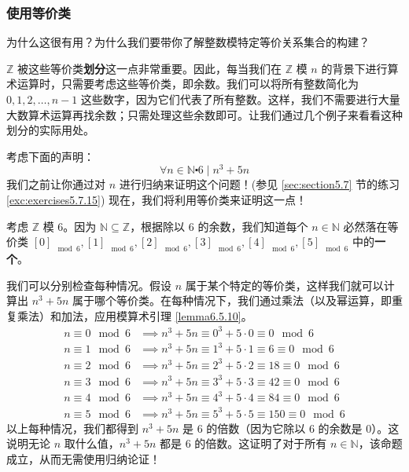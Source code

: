 \subsubsection*{使用等价类}

为什么这很有用？为什么我们要带你了解整数模特定等价关系集合的构建？

$\mathbb{Z}$ 被这些等价类\textbf{划分}这一点非常重要。因此，每当我们在 $\mathbb{Z}$ 模 $n$ 的背景下进行算术运算时，只需要考虑这些等价类，即余数。我们可以将所有整数简化为 ${0, 1, 2, \dots , n-1}$ 这些数字，因为它们代表了所有整数。这样，我们不需要进行大量大数算术运算再找余数；只需处理这些余数即可。让我们通过几个例子来看看这种划分的实际用处。\\

\begin{example}
    考虑下面的声明：
    \[\forall n \in \mathbb{N} \centerdot 6 \mid n^3 + 5n\]
    我们之前让你通过对 $n$ 进行归纳来证明这个问题！(参见 \ref{sec:section5.7} 节的练习 \ref{exc:exercises5.7.15}) 现在，我们将利用等价类来证明这一点！

    考虑 $\mathbb{Z}$ 模 $6$。因为 $\mathbb{N} \subseteq \mathbb{Z}$，根据除以 $6$ 的余数，我们知道每个 $n \in \mathbb{N}$ 必然落在等价类 $[0]_{\mod 6}, [1]_{\mod 6}, [2]_{\mod 6}, [3]_{\mod 6}, [4]_{\mod 6}, [5]_{\mod 6}$ 中的\textbf{一个}。

    我们可以分别检查每种情况。假设 $n$ 属于某个特定的等价类，这样我们就可以计算出 $n^3+5n$ 属于哪个等价类。在每种情况下，我们通过乘法（以及幂运算，即重复乘法）和加法，应用模算术引理 \ref{lemma6.5.10}。
    \begin{align*}
        n \equiv 0 \mod 6 &\implies n^3 + 5n \equiv 0^3 + 5 \cdot 0 \equiv 0 \mod 6 \\
        n \equiv 1 \mod 6 &\implies n^3 + 5n \equiv 1^3 + 5 \cdot 1 \equiv 6 \equiv 0 \mod 6 \\
        n \equiv 2 \mod 6 &\implies n^3 + 5n \equiv 2^3 + 5 \cdot 2 \equiv 18 \equiv 0 \mod 6 \\
        n \equiv 3 \mod 6 &\implies n^3 + 5n \equiv 3^3 + 5 \cdot 3 \equiv 42 \equiv 0 \mod 6 \\
        n \equiv 4 \mod 6 &\implies n^3 + 5n \equiv 4^3 + 5 \cdot 4 \equiv 84 \equiv 0 \mod 6 \\
        n \equiv 5 \mod 6 &\implies n^3 + 5n \equiv 5^3 + 5 \cdot 5 \equiv 150 \equiv 0 \mod 6 
    \end{align*}
    以上每种情况，我们都得到 $n^3 + 5n$ 是 $6$ 的倍数（因为它除以 $6$ 的余数是 $0$）。这说明无论 $n$ 取什么值，$n^3 + 5n$ 都是 $6$ 的倍数。这证明了对于所有 $n \in \mathbb{N}$，该命题成立，从而无需使用归纳论证！
\end{example}

